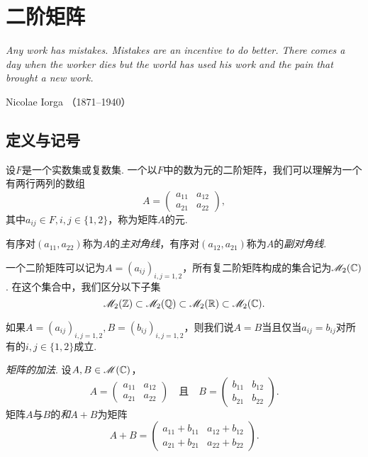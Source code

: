 \chapter{二阶矩阵}
\begin{proverb}
  { \itshape
   Any work has mistakes. Mistakes are an incentive
   to do better. There comes a day when the worker
   dies but the world has used his work and the pain
   that brought a new work.
  }

\hfill Nicolae Iorga （1871–1940）
\end{proverb}
\section{定义与记号}
\begin{definition}
  设$F$是一个实数集或复数集. 一个以$F$中的数为元的二阶矩阵，我们可以理解为一个有两行两列的数组
  \[
    A = \begin{pmatrix}
      a_{11} & a_{12} \\
      a_{21} & a_{22}
    \end{pmatrix},
  \]
  其中$a_{ij}\in F,i,j\in\{1,2\}$，称为矩阵$A$的元.
  \end{definition}

  有序对$(a_{11},a_{22})$称为$A$的\emph{主对角线}，有序对$(a_{12},a_{21})$称为$A$的\emph{副对角线}.

  一个二阶矩阵可以记为$A=(a_{ij})_{i,j=1,2}$，所有复二阶矩阵构成的集合记为$\mathscr M_2(\mathbb C)$. 在这个集合中，我们区分以下子集
  \[
    \mathscr M_2(\mathbb Z) \subset \mathscr M_2(\mathbb Q) \subset \mathscr M_2(\mathbb R)
    \subset \mathscr M_2(\mathbb C).
  \]

  如果$A=(a_{ij})_{i,j=1,2},B=(b_{ij})_{i,j=1,2}$，则我们说$A=B$当且仅当$a_{ij}=b_{ij}$对所有的$i,j\in\{1,2\}$成立.

  \begin{definition}
    \emph{矩阵的加法}. 设$A,B\in\mathscr M(\mathbb C)$，
    \[
      A = \begin{pmatrix}
        a_{11} & a_{12} \\
        a_{21} & a_{22}
      \end{pmatrix}\quad \text{且}\quad
      B = \begin{pmatrix}
        b_{11} & b_{12} \\
        b_{21} & b_{22}
      \end{pmatrix}.
    \]
    矩阵$A$与$B$的\emph{和}$A+B$为矩阵
    \[
      A + B = \begin{pmatrix}
        a_{11} + b_{11} & a_{12} + b_{12}\\
        a_{21} + b_{21} & a_{22} + b_{22}
      \end{pmatrix}.
    \]
  \end{definition}

